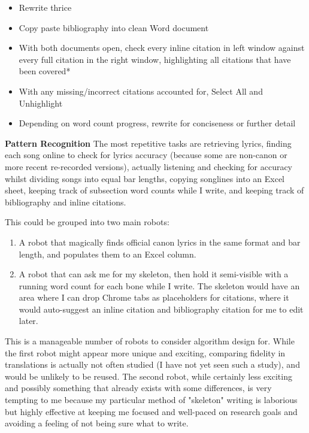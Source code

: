 \documentclass[12pt]{article}
\begin{document}
\begin{enumerate}
\begin{itemize}
        \item Rewrite thrice
        \item Copy paste bibliography into clean Word document
        \item With both documents open, check every inline citation in left window against every full citation in the right window, highlighting all citations that have been covered*
        \item With any missing/incorrect citations accounted for, Select All and Unhighlight
        \item Depending on word count progress, rewrite for conciseness or further detail
    \end{itemize}
\end{enumerate}

\vspace{1em}
\maketitle \textbf{Pattern Recognition}
The most repetitive tasks are retrieving lyrics, finding each song online to check for lyrics accuracy (because some are non-canon or more recent re-recorded versions), actually listening and checking for accuracy whilst dividing songs into equal bar lengths, copying songlines into an Excel sheet, keeping track of subsection word counts while I write, and keeping track of bibliography and inline citations.

\vspace{0.5em}
This could be grouped into two main robots: 
\begin{enumerate}
    \item A robot that magically finds official canon lyrics in the same format and bar length, and populates them to an Excel column.
    \item A robot that can ask me for my skeleton, then hold it semi-visible with a running word count for each bone while I write. The skeleton would have an area where I can drop Chrome tabs as placeholders for citations, where it would auto-suggest an inline citation and bibliography citation for me to edit later.
\end{enumerate}
This is a manageable number of robots to consider algorithm design for. While the first robot might appear more unique and exciting, comparing fidelity in translations is actually not often studied (I have not yet seen such a study), and would be unlikely to be reused. The second robot, while certainly less exciting and possibly something that already exists with some differences, is very tempting to me because my particular method of "skeleton" writing is laborious but highly effective at keeping me focused and well-paced on research goals and avoiding a feeling of not being sure what to write.
\end{document}
